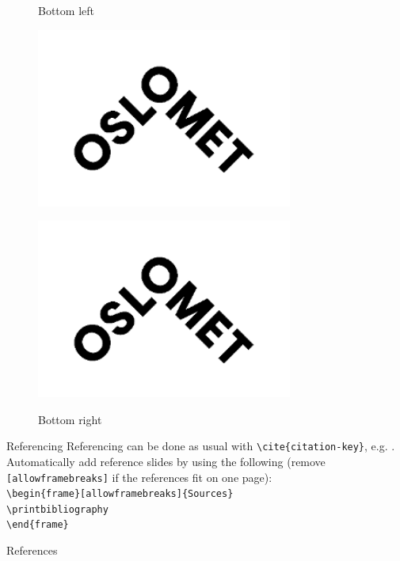 \documentclass{beamer}
\begin{document}
\begin{frame}
\begin{figure}[ht]
\begin{minipage}[t]{0.45\linewidth}
            \label{fig:topright}
        \end{minipage}
        \begin{minipage}[t]{0.45\linewidth}
            \centering
            \caption{Bottom left}
            \includegraphics[width=0.75\textwidth]{figures/oslomet_logo.png}
            \label{fig:bottomleft}
        \end{minipage}
        \hspace{0.5cm}
        \begin{minipage}[t]{0.45\linewidth}
            \centering
            \caption{Bottom right}
            \includegraphics[width=0.75\textwidth]{figures/oslomet_logo.png}
            \label{fig:bottomright}
        \end{minipage}
    \end{figure}
\end{frame}

\begin{frame}{Referencing}
    Referencing can be done as usual with \texttt{\textbackslash cite\{citation-key\}}, e.g. \cite{winkler2018bdt}. Automatically add reference slides by using the following (remove \texttt{[allowframebreaks]} if the references fit on one page): \\
    
    
    \texttt{\textbackslash begin\{frame\}[allowframebreaks]\{Sources\}} \\
        \texttt{\textbackslash printbibliography} \\
    \texttt{\textbackslash end\{frame\}} 
\end{frame}


\begin{frame}{References}
    \printbibliography
\end{frame}
\end{document}
